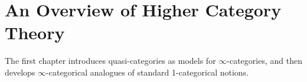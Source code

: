 \chapter{An Overview of Higher Category Theory}

The first chapter introduces quasi-categories as models for $\infty $-categories, and then develops $\infty $-categorical analogues of standard 1-categorical notions.




